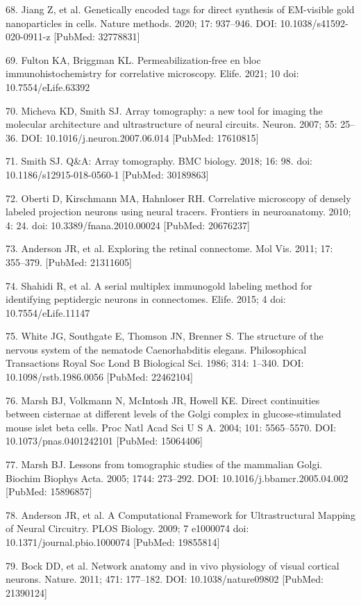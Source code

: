 \documentclass{article}
\begin{document}
\begin{hangpars}
68. Jiang Z, et al. Genetically encoded tags for direct synthesis of EM-visible gold nanoparticles in cells. Nature methods. 2020; 17: 937–946. DOI: 10.1038/s41592-020-0911-z [PubMed: 32778831]

69. Fulton KA, Briggman KL. Permeabilization-free en bloc immunohistochemistry for correlative microscopy. Elife. 2021; 10 doi: 10.7554/eLife.63392

70. Micheva KD, Smith SJ. Array tomography: a new tool for imaging the molecular architecture and ultrastructure of neural circuits. Neuron. 2007; 55: 25–36. DOI: 10.1016/j.neuron.2007.06.014 [PubMed: 17610815]

71. Smith SJ. Q\&A: Array tomography. BMC biology. 2018; 16: 98. doi: 10.1186/s12915-018-0560-1 [PubMed: 30189863]

72. Oberti D, Kirschmann MA, Hahnloser RH. Correlative microscopy of densely labeled projection neurons using neural tracers. Frontiers in neuroanatomy. 2010; 4: 24. doi: 10.3389/fnana.2010.00024 [PubMed: 20676237]

73. Anderson JR, et al. Exploring the retinal connectome. Mol Vis. 2011; 17: 355–379. [PubMed: 21311605]

74. Shahidi R, et al. A serial multiplex immunogold labeling method for identifying peptidergic neurons in connectomes. Elife. 2015; 4 doi: 10.7554/eLife.11147

75. White JG, Southgate E, Thomson JN, Brenner S. The structure of the nervous system of the nematode Caenorhabditis elegans. Philosophical Transactions Royal Soc Lond B Biological Sci. 1986; 314: 1–340. DOI: 10.1098/rstb.1986.0056 [PubMed: 22462104]

76. Marsh BJ, Volkmann N, McIntosh JR, Howell KE. Direct continuities between cisternae at different levels of the Golgi complex in glucose-stimulated mouse islet beta cells. Proc Natl Acad Sci U S A. 2004; 101: 5565–5570. DOI: 10.1073/pnas.0401242101 [PubMed: 15064406]

77. Marsh BJ. Lessons from tomographic studies of the mammalian Golgi. Biochim Biophys Acta. 2005; 1744: 273–292. DOI: 10.1016/j.bbamcr.2005.04.002 [PubMed: 15896857]

78. Anderson JR, et al. A Computational Framework for Ultrastructural Mapping of Neural Circuitry. PLOS Biology. 2009; 7 e1000074 doi: 10.1371/journal.pbio.1000074 [PubMed: 19855814]

79. Bock DD, et al. Network anatomy and in vivo physiology of visual cortical neurons. Nature. 2011; 471: 177–182. DOI: 10.1038/nature09802 [PubMed: 21390124]


\end{hangpars}
\end{document}
